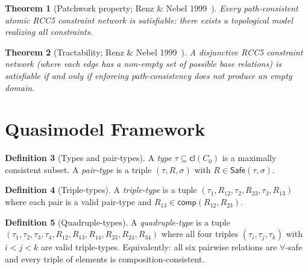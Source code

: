 \documentclass[a4paper,11pt]{article}
\newtheorem{theorem}{Theorem}[section]
\theoremstyle{definition}
\newtheorem{definition}[theorem]{Definition}
\newcommand{\comp}{\ensuremath{\mathsf{comp}}}
\newcommand{\cl}{\ensuremath{\mathsf{cl}}}
\newcommand{\Safe}{\ensuremath{\mathsf{Safe}}}
\begin{document}
\begin{theorem}[Patchwork property; Renz \& Nebel 1999~\cite{RenzNebel1999}]
\label{thm:patchwork}
Every path-consistent atomic RCC5 constraint network is
satisfiable\textup{:} there exists a topological model
realizing all constraints.
\end{theorem}

\begin{theorem}[Tractability; Renz \& Nebel 1999~\cite{RenzNebel1999}]
\label{thm:tractability}
A disjunctive RCC5 constraint network \textup{(}where each edge
has a non-empty set of possible base relations\textup{)} is
satisfiable if and only if enforcing path-consistency does not
produce an empty domain.
\end{theorem}


\section{Quasimodel Framework}
\label{sec:quasimodel}

\begin{definition}[Types and pair-types]
\label{def:types}
A \emph{type} $\tau \subseteq \cl(C_0)$ is a maximally consistent
subset.  A \emph{pair-type} is a triple $(\tau, R, \sigma)$ with
$R \in \Safe(\tau, \sigma)$.
\end{definition}

\begin{definition}[Triple-types]
\label{def:triple}
A \emph{triple-type} is a tuple
$(\tau_1, R_{12}, \tau_2, R_{23}, \tau_3, R_{13})$
where each pair is a valid pair-type and
$R_{13} \in \comp(R_{12}, R_{23})$.
\end{definition}

\begin{definition}[Quadruple-types]
\label{def:quadruple}
A \emph{quadruple-type} is a tuple
$(\tau_1, \tau_2, \tau_3, \tau_4,
  R_{12}, R_{13}, R_{14}, R_{23}, R_{24}, R_{34})$
where all four triples
$(\tau_i, \tau_j, \tau_k)$ with $i < j < k$ are valid
triple-types.  Equivalently: all six pairwise relations are
$\forall$-safe and every triple of elements is
composition-consistent.
\end{definition}
\end{document}
